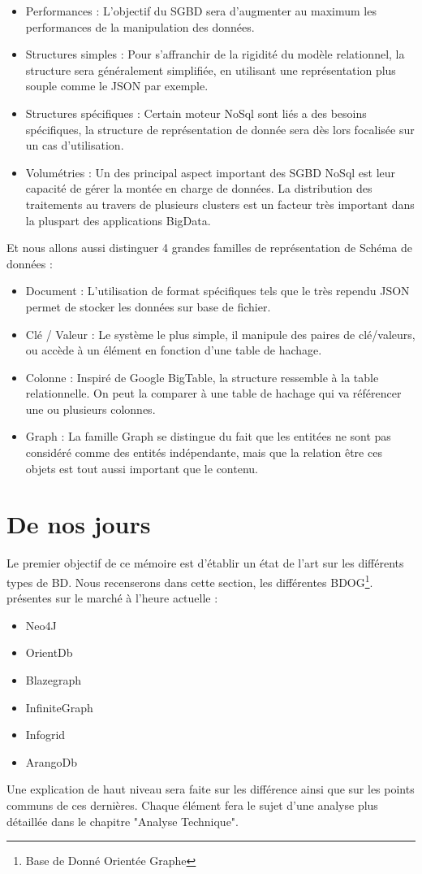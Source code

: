 \documentclass[a4paper,12pt,twoside, fleqn]{report}
\begin{document}
\begin{itemize}
\item Performances : L'objectif du SGBD sera d'augmenter au maximum les performances de la manipulation des données. 
\item Structures simples : Pour s'affranchir de la rigidité du modèle relationnel, la structure sera généralement simplifiée, en utilisant une représentation plus souple comme le JSON par exemple.
\item Structures spécifiques : Certain moteur NoSql sont liés a des besoins spécifiques, la structure de représentation de donnée sera dès lors focalisée sur un cas d'utilisation.
\item Volumétries : Un des principal aspect important des SGBD NoSql est leur capacité de gérer la montée en charge de données. La distribution des traitements au travers de plusieurs clusters est un facteur très important dans la pluspart des applications BigData.
\end{itemize} 

Et nous allons aussi distinguer 4 grandes familles de représentation de Schéma de données :

\begin{itemize}
\item Document : L'utilisation de format spécifiques tels que le très rependu JSON permet de stocker les données sur base de fichier.
\item Clé / Valeur : Le système le plus simple, il manipule des paires de clé/valeurs, ou accède à un élément en fonction d'une table de hachage.
\item Colonne : Inspiré de Google BigTable, la structure ressemble à la table relationnelle. On peut la comparer à une table de hachage qui va référencer une ou plusieurs colonnes.
\item Graph : La famille Graph se distingue du fait que les entitées ne sont pas considéré comme des entités indépendante, mais que la relation être ces objets est tout aussi important que le contenu.
\end{itemize} 
 
 
\section{De nos jours}	
Le premier objectif de ce mémoire est d'établir un état de l'art sur les différents types de BD. Nous recenserons dans cette section, les différentes BDOG\footnote{Base de Donné Orientée Graphe}. présentes sur le marché à l'heure actuelle :
\begin{itemize}
\item Neo4J
\item OrientDb
\item Blazegraph
\item InfiniteGraph
\item Infogrid
\item ArangoDb
\end{itemize}
Une explication de haut niveau sera faite sur les différence ainsi que sur les points communs de ces dernières. Chaque élément fera le sujet d'une analyse plus détaillée dans le chapitre "Analyse Technique".
\end{document}

